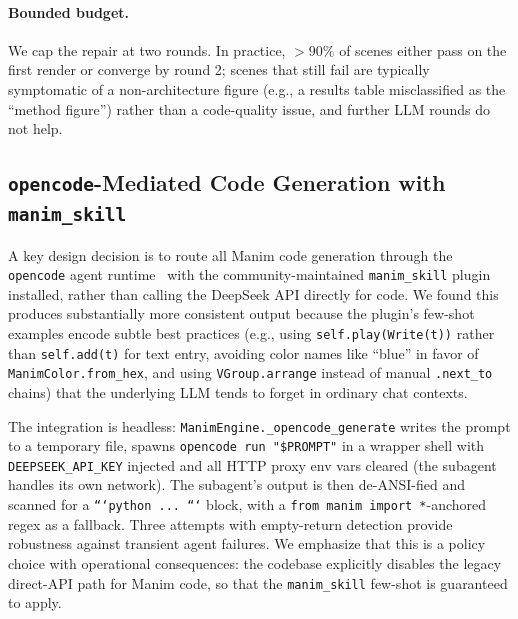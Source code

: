 \documentclass[11pt,a4paper]{article}
\begin{document}
\paragraph{Bounded budget.}
We cap the repair at two rounds. In practice, $>90\%$ of scenes either pass on the first render or converge by round 2; scenes that still fail are typically symptomatic of a non-architecture figure (e.g., a results table misclassified as the ``method figure'') rather than a code-quality issue, and further LLM rounds do not help.

\subsection{\texttt{opencode}-Mediated Code Generation with \texttt{manim\_skill}}
\label{sec:method:opencode}

A key design decision is to route all Manim code generation through the \texttt{opencode} agent runtime~\citep{opencode2024} with the community-maintained \texttt{manim\_skill} plugin installed, rather than calling the DeepSeek API directly for code. We found this produces substantially more consistent output because the plugin's few-shot examples encode subtle best practices (e.g., using \texttt{self.play(Write(t))} rather than \texttt{self.add(t)} for text entry, avoiding color names like ``blue'' in favor of \texttt{ManimColor.from\_hex}, and using \texttt{VGroup.arrange} instead of manual \texttt{.next\_to} chains) that the underlying LLM tends to forget in ordinary chat contexts.

The integration is headless: \texttt{ManimEngine.\_opencode\_generate} writes the prompt to a temporary file, spawns \texttt{opencode run "\$PROMPT"} in a wrapper shell with \texttt{DEEPSEEK\_API\_KEY} injected and all HTTP proxy env vars cleared (the subagent handles its own network). The subagent's output is then de-ANSI-fied and scanned for a \texttt{```python ... ```} block, with a \texttt{from manim import *}-anchored regex as a fallback. Three attempts with empty-return detection provide robustness against transient agent failures. We emphasize that this is a policy choice with operational consequences: the codebase explicitly disables the legacy direct-API path for Manim code, so that the \texttt{manim\_skill} few-shot is guaranteed to apply.
\end{document}
